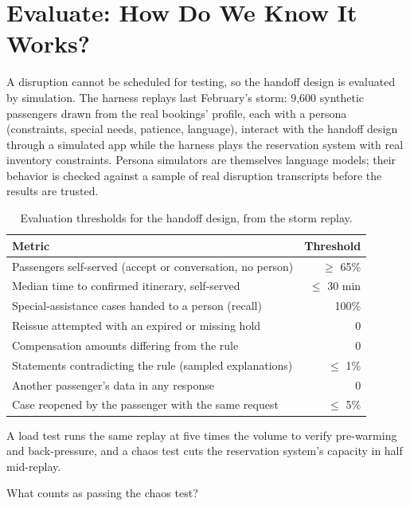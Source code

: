 \section{Evaluate: How Do We Know It Works?}
\label{sec:air-evaluate}

A disruption cannot be scheduled for testing, so the handoff design is evaluated by simulation. The harness replays last February's storm: 9{,}600 synthetic passengers drawn from the real bookings' profile, each with a persona (constraints, special needs, patience, language), interact with the handoff design through a simulated app while the harness plays the reservation system with real inventory constraints. Persona simulators are themselves language models; their behavior is checked against a sample of real disruption transcripts before the results are trusted.

\begin{table}[htbp]
\centering
\small
\caption{Evaluation thresholds for the handoff design, from the storm replay.}
\label{tab:air-thresholds}
\begin{tabularx}{\textwidth}{@{}>{\raggedright\arraybackslash}X r@{}}
\toprule
\rowcolor{coHead} Metric & Threshold \\
\midrule
Passengers self-served (accept or conversation, no person) & $\ge$ 65\% \\
Median time to confirmed itinerary, self-served & $\le$ 30 min \\
Special-assistance cases handed to a person (recall) & 100\% \\
Reissue attempted with an expired or missing hold & 0 \\
Compensation amounts differing from the rule & 0 \\
Statements contradicting the rule (sampled explanations) & $\le$ 1\% \\
Another passenger's data in any response & 0 \\
Case reopened by the passenger with the same request & $\le$ 5\% \\
\bottomrule
\end{tabularx}
\end{table}

A load test runs the same replay at five times the volume to verify pre-warming and back-pressure, and a chaos test cuts the reservation system's capacity in half mid-replay. \begin{quickcheck}
What counts as passing the chaos test?
\end{quickcheck}

